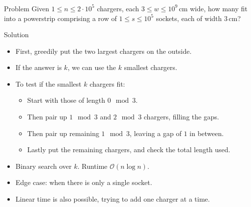 \begin{frame}
  \frametitle{\problemtitle}
  \begin{block}{Problem}
    Given $1\leq n\leq 2\cdot 10^5$ chargers, each $3\leq w\leq
    10^9\,\textrm{cm}$ wide, how many fit into a powerstrip
    comprising a row of $1\leq s\leq 10^5$ sockets, each of width $3\,\textrm{cm}$?
  \end{block}
  \pause
  \begin{block}{Solution}
    \begin{itemize}
    \item<+-> First, greedily put the two largest chargers on the outside.
    \item<+-> If the answer is $k$, we can use the $k$ smallest chargers.
    \item<+-> To test if the smallest $k$ chargers fit:
      \begin{itemize}
      \item Start with those of length $0\mod 3$.
      \item Then pair up $1\mod 3$ and $2\mod 3$ chargers, filling the
        gaps.
      \item Then pair up remaining $1\mod 3$, leaving a gap of $1$ in between.
      \item Lastly put the remaining chargers, and check the total length used.
      \end{itemize}
    \item<+-> Binary search over $k$. Runtime $\mathcal O(n \log n)$.
    \item<+-> Edge case: when there is only a single socket.
    \item<+-> Linear time is also possible, trying to add one charger at a
      time.
    \end{itemize}
  \end{block}
  \vspace{-0.5em}
  \solvestats
\end{frame}

